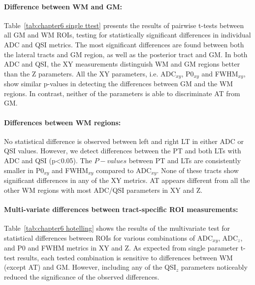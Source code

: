 \paragraph{Difference between WM and GM: }
Table~\ref{tab:chapter6 single ttest} presents the results of pairwise t-tests between all GM and WM \glspl{ROI}, testing for statistically significant differences in individual ADC and QSI metrics. The most significant differences are found between both the lateral tracts and GM region, as well as the posterior tract and GM. In both ADC and QSI, the XY measurements distinguish WM and GM regions better than the Z parameters. All the XY parameters, i.e. ADC$_{xy}$, P0$_{xy}$ and FWHM$_{xy}$, show similar p-values in detecting the differences between GM and the WM regions. In contrast, neither of the parameters is able to discriminate AT from GM.

\paragraph{Differences between WM regions: }
No statistical difference is observed between left and right LT in either ADC or QSI values. However, we detect differences between the PT and both LTs with ADC and QSI (p<0.05). The $P-values$ between PT and LTs are consistently smaller in P0$_{xy}$ and FWHM$_{xy}$ compared to ADC$_{xy}$. None of these tracts show significant differences in any of the XY metrics. AT appears different from all the other WM regions with  most ADC/QSI parameters in XY and Z.

\paragraph*{Multi-variate differences between tract-specific ROI measurements: }
Table~\ref{tab:chapter6 hotelling} shows the results of the multivariate test for statistical differences between \glspl{ROI} for various combinations of ADC$_{xy}$, ADC$_{z}$, and P0 and FWHM metrics in XY and Z. As expected from single parameter t-test results, each tested combination is sensitive to differences between WM (except AT) and GM. However, including any of the QSI$_z$ parameters noticeably reduced the significance of the observed differences.

